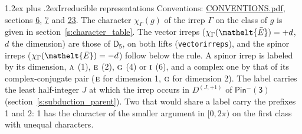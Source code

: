 \documentclass[10pt,a4paper]{article}
\makeatletter
\renewcommand\section{\@startsection{section}{1}{\z@}{-3ex plus -1ex minus -.2ex}%
  {1.2ex plus .2ex}{\normalfont\large\sffamily\bfseries\color{parttitle}}}
\numberwithin{equation}{section}
\newcommand{\eltfont}[1]{{\let\sigma\eltsigma\mathelt{#1}}}
\newcommand{\grp}[1]{\mathsf{#1}}
\newcommand{\irr}[1]{\text{\normalfont\scshape #1}}
\newcommand{\elt}[1]{\eltfont{#1}}
\newcommand{\irrJp}[2]{D^{(#1,#2)}}
\newcommand{\irchar}[1]{\chi_{#1}}
\newcommand{\barred}[1]{\bar{#1}}
\makeatother
\begin{document}
\section{Irreducible representations}\label{s:irreps}
Conventions: \href{../../CONVENTIONS.pdf}{CONVENTIONS.pdf}, sections \href{../../../rotation/CONVENTIONS.pdf\#conv.6}{6}, \href{../../../rotation/CONVENTIONS.pdf\#conv.7}{7} and \href{../../CONVENTIONS.pdf\#conv.23}{23}.
\leavevmode\label{n:function.character}\label{n:irrep.Gamma}The character $\irchar{\Gamma}(g)$ of the irrep $\Gamma$ on the class of $g$ is given in section~\ref{s:character_table}. \label{n:index.dimension}The vector irreps ($\irchar{\Gamma}(\elt{\barred{E}}) = +d$, $d$ the dimension) are those of \href{../../../rotation/data/pdf/D5.pdf}{$\grp{D_{5}}$}, on both lifts (\texttt{vectorirreps}), and the spinor irreps ($\irchar{\Gamma}(\elt{\barred{E}}) = -d$) follow below the rule. A spinor irrep is labeled by its dimension, $\irr{a}$ (1), $\irr{e}$ (2), $\irr{g}$ (4) or $\irr{i}$ (6), and a complex one by that of its complex-conjugate pair ($\irr{e}$ for dimension 1, $\irr{g}$ for dimension 2). The label carries the least half-integer $J$ at which the irrep occurs in $\irrJp{J}{+1}$ of $\grp{Pin^{-}(3)}$ (section~\ref{s:subduction_parent}). Two that would share a label carry the prefixes 1 and 2: 1 has the character of the smaller argument in $[0, 2\pi)$ on the first class with unequal characters.
\end{document}
